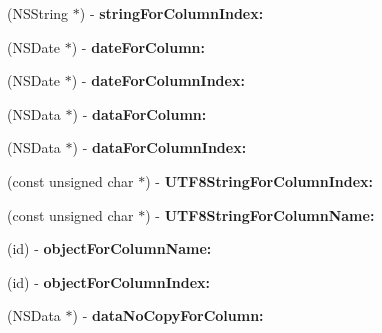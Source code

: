 \begin{DoxyCompactItemize}
\item 
\hypertarget{interface_f_m_result_set_a2861bedbfd86b063b95e247622123aeb}{
(NSString $\ast$) -\/ {\bfseries stringForColumnIndex:}}
\label{interface_f_m_result_set_a2861bedbfd86b063b95e247622123aeb}

\item 
\hypertarget{interface_f_m_result_set_aab2ade804e7995ffb9290f0f5641150e}{
(NSDate $\ast$) -\/ {\bfseries dateForColumn:}}
\label{interface_f_m_result_set_aab2ade804e7995ffb9290f0f5641150e}

\item 
\hypertarget{interface_f_m_result_set_a1049179635791bf8d6c8db9c13d841f6}{
(NSDate $\ast$) -\/ {\bfseries dateForColumnIndex:}}
\label{interface_f_m_result_set_a1049179635791bf8d6c8db9c13d841f6}

\item 
\hypertarget{interface_f_m_result_set_afaed768a415cf282b725b0b9c4f734bb}{
(NSData $\ast$) -\/ {\bfseries dataForColumn:}}
\label{interface_f_m_result_set_afaed768a415cf282b725b0b9c4f734bb}

\item 
\hypertarget{interface_f_m_result_set_a19ae688d5d90178e0fb4b2d14fa9a1b3}{
(NSData $\ast$) -\/ {\bfseries dataForColumnIndex:}}
\label{interface_f_m_result_set_a19ae688d5d90178e0fb4b2d14fa9a1b3}

\item 
\hypertarget{interface_f_m_result_set_a341dcf454524009405a64943ba61b7d4}{
(const unsigned char $\ast$) -\/ {\bfseries UTF8StringForColumnIndex:}}
\label{interface_f_m_result_set_a341dcf454524009405a64943ba61b7d4}

\item 
\hypertarget{interface_f_m_result_set_a56f8f0fa06f9f563bb0394447502cdd3}{
(const unsigned char $\ast$) -\/ {\bfseries UTF8StringForColumnName:}}
\label{interface_f_m_result_set_a56f8f0fa06f9f563bb0394447502cdd3}

\item 
\hypertarget{interface_f_m_result_set_a88afc92911df5389fbecdff8041f4150}{
(id) -\/ {\bfseries objectForColumnName:}}
\label{interface_f_m_result_set_a88afc92911df5389fbecdff8041f4150}

\item 
\hypertarget{interface_f_m_result_set_a97de6485e33a8975c0e765d2cbfab902}{
(id) -\/ {\bfseries objectForColumnIndex:}}
\label{interface_f_m_result_set_a97de6485e33a8975c0e765d2cbfab902}

\item 
\hypertarget{interface_f_m_result_set_a90ebd0e766bf17e252737bbbcaaf04c7}{
(NSData $\ast$) -\/ {\bfseries dataNoCopyForColumn:}}
\label{interface_f_m_result_set_a90ebd0e766bf17e252737bbbcaaf04c7}


\end{DoxyCompactItemize}
